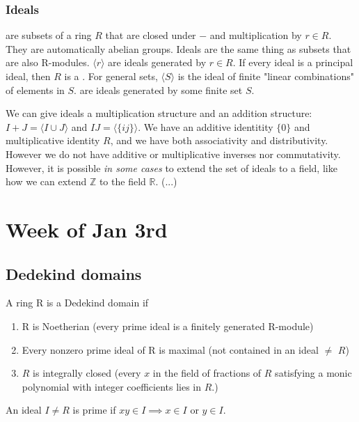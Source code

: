 \subsubsection{Ideals}
 are subsets of a ring $R$ that are closed under $-$ and multiplication by $r\in R$. They are automatically abelian groups. Ideals are the same thing as subsets that are also R-modules.  $\langle r \rangle$ are ideals generated by $r\in R$. If every ideal is a principal ideal, then $R$ is a . For general sets, $\langle S \rangle$ is the ideal of finite "linear combinations" of elements in $S$.  are ideals generated by some finite set $S$.

We can give ideals a multiplication structure and an addition structure: $I+ J=\langle I\cup J\rangle$ and $IJ=\langle \{ij\} \rangle$. We have an additive identitity $\{0\}$ and multiplicative identity $R$, and we have both associativity and distributivity. However we do not have additive or multiplicative inverses nor commutativity. However, it is possible \textit{in some cases} to extend the set of ideals to a field,  like how we can extend $\mathbb{Z}$ to the field $\mathbb{R}$. (...)

\section{Week of Jan 3rd}
\subsection{Dedekind domains}
\begin{definition}
A ring R is a Dedekind domain if
\begin{enumerate}
    \item R is Noetherian (every prime ideal is a finitely generated R-module)
    \item Every nonzero prime ideal of R is maximal (not contained in an ideal $\neq$ $R$)
    \item $R$ is integrally closed (every $x$ in the field of fractions of $R$ satisfying a monic polynomial with integer coefficients lies in $R$.)
\end{enumerate}
\end{definition}
\begin{definition}
An ideal $I\neq R$ is prime if $xy\in I\implies x\in I$ or $y\in I$.
\end{definition}

